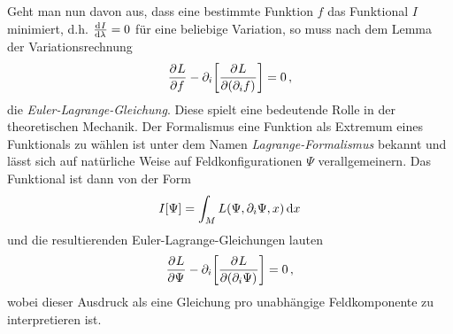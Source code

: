 Geht man nun davon aus, dass eine bestimmte Funktion $f$ das Funktional
$I$ minimiert, d.h. $\od{I}{\lambda}=0$ für eine beliebige Variation, 
so muss nach dem Lemma der Variationsrechnung
\begin{equation}
\dpd{L}{f}
-\partial_i\left[\dpd{L}{(\partial_i f)}\right]=0\,,
\end{equation}
die \emph{Euler-Lagrange-Gleichung}. Diese spielt eine bedeutende Rolle in der
theoretischen Mechanik. Der Formalismus eine Funktion als Extremum eines
Funktionals zu wählen ist unter dem Namen \emph{Lagrange-Formalismus} bekannt und lässt sich auf
natürliche Weise auf Feldkonfigurationen $\Psi$ verallgemeinern. Das
Funktional ist dann von der Form
\begin{equation}
I[\Psi]=\int_M L\left(\Psi,\partial_i \Psi,x\right)\dif x
\end{equation}
und die resultierenden Euler-Lagrange-Gleichungen lauten
\begin{equation}
\dpd{L}{\Psi}
-\partial_i\left[\dpd{L}{(\partial_i\Psi)}\right]=0\,,
\end{equation}
wobei dieser Ausdruck als eine Gleichung pro
unabhängige Feldkomponente zu interpretieren ist.
